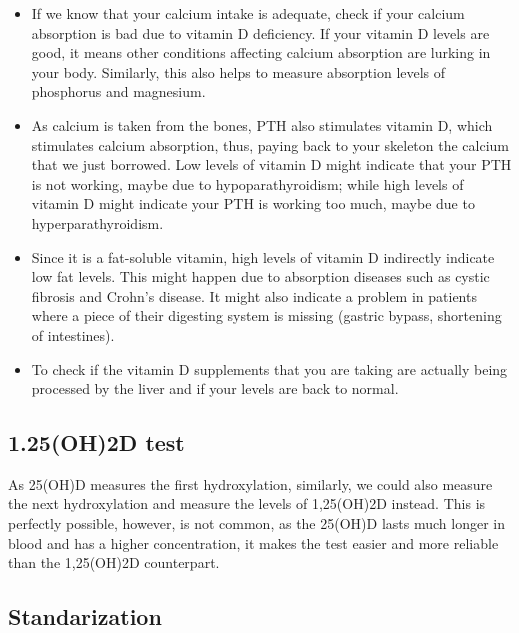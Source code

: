 \begin{itemize}

    \item If we know that your calcium intake is adequate, check if your calcium absorption is bad due to vitamin D deficiency. If your vitamin D levels are good, it means other conditions affecting calcium absorption are lurking in your body. Similarly, this also helps to measure absorption levels of phosphorus and magnesium.
    
    \item As calcium is taken from the bones, PTH also stimulates vitamin D, which stimulates calcium absorption, thus, paying back to your skeleton the calcium that we just borrowed. Low levels of vitamin D might indicate that your PTH is not working, maybe due to hypoparathyroidism; while high levels of vitamin D might indicate your PTH is working too much, maybe due to hyperparathyroidism.
    
    \item Since it is a fat-soluble vitamin, high levels of vitamin D indirectly indicate low fat levels. This might happen due to absorption diseases such as cystic fibrosis and Crohn’s disease. It might also indicate a problem in patients where a piece of their digesting system is missing (gastric bypass, shortening of intestines).
    
    \item  To check if the vitamin D supplements that you are taking are actually being processed by the liver and if your levels are back to normal.
    
\end{itemize}



\subsection{1.25(OH)2D test}

As 25(OH)D measures the first hydroxylation, similarly, we could also measure the next hydroxylation and measure the levels of 1,25(OH)2D instead. This is perfectly possible, however, is not common, as the 25(OH)D lasts much longer in blood and has a higher concentration, it makes the test easier and more reliable than the 1,25(OH)2D counterpart.

\subsection{Standarization}
\label{vitd:vdsp}

